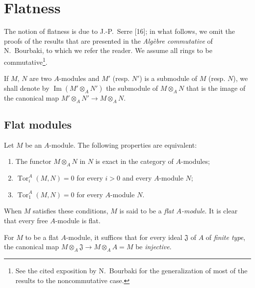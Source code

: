 \section{Flatness}
\label{section:0.6}

\begin{env}[6.0]
The notion of flatness is due to J.-P.~Serre [16]; in what follows, we omit
the proofs of the results that are presented in the \emph{Algèbre
commutative} of N.~Bourbaki, to which we refer the reader. We
assume all rings to be commutative\footnote{See the cited exposition by
N.~Bourbaki for the generalization of most of the results to the
noncommutative case.}.


If $M$, $N$ are two $A$-modules and $M'$ (resp. $N'$) is a submodule of $M$
(resp. $N$), we shall denote by $\operatorname{Im}(M'\otimes_A N')$ the submodule
of $M\otimes_A N$ that is the image of the canonical map
$M'\otimes_A N'\to M\otimes_A N$.
\end{env}

\subsection{Flat modules}
\label{subsection:0.6.1}

\begin{env}[6.1.1]
\label{0.6.1.1}
Let $M$ be an $A$-module. The following properties are equivalent:
\begin{enumerate}
  \item[$a)$] The functor $M\otimes_A N$ in $N$ is exact in the category
    of $A$-modules;
  \item[$b)$] $\operatorname{Tor}_i^A(M,N)=0$ for every $i>0$ and every
    $A$-module $N$;
  \item[$c)$] $\operatorname{Tor}_1^A(M,N)=0$ for every $A$-module $N$.
\end{enumerate}

When $M$ satisfies these conditions, $M$ is said to be a
\emph{flat $A$-module}. It is clear that every free $A$-module is flat.

For $M$ to be a flat $A$-module, it suffices that for every ideal
$\mathfrak{J}$ of $A$ of \emph{finite type}, the canonical map
$M\otimes_A\mathfrak{J}\to M\otimes_A A=M$ be \emph{injective}.
\end{env}

